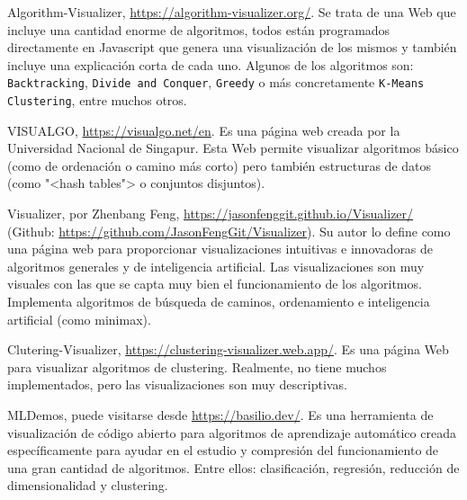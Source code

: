 Algorithm-Visualizer, \url{https://algorithm-visualizer.org/}. Se trata de una
Web que incluye una cantidad enorme de algoritmos, todos están programados
directamente en Javascript que genera una visualización de los mismos y también
incluye una explicación corta de cada uno. Algunos de los algoritmos son:
\texttt{Backtracking}, \texttt{Divide and Conquer}, \texttt{Greedy} o más
concretamente \texttt{K-Means Clustering}, entre muchos otros.

VISUALGO, \url{https://visualgo.net/en}. Es una página web creada por la
Universidad Nacional de Singapur. Esta Web permite visualizar algoritmos básico
(como de ordenación o camino más corto) pero también estructuras de datos (como
"<hash tables"> o conjuntos disjuntos).

Visualizer, por Zhenbang Feng, \url{https://jasonfenggit.github.io/Visualizer/}
(Github: \url{https://github.com/JasonFengGit/Visualizer}). Su autor lo define
como una página web para proporcionar visualizaciones intuitivas e innovadoras
de algoritmos generales y de inteligencia artificial. Las visualizaciones son
muy visuales con las que se capta muy bien el funcionamiento de los algoritmos.
Implementa algoritmos de búsqueda de caminos, ordenamiento e inteligencia
artificial (como minimax).

Clutering-Visualizer, \url{https://clustering-visualizer.web.app/}. Es una
página Web para visualizar algoritmos de clustering. Realmente, no tiene muchos
implementados, pero las visualizaciones son muy descriptivas.

MLDemos, puede visitarse desde \url{https://basilio.dev/}. Es una herramienta de
visualización de código abierto para algoritmos de aprendizaje automático creada
específicamente para ayudar en el estudio y compresión del funcionamiento de una
gran cantidad de algoritmos. Entre ellos: clasificación, regresión, reducción de
dimensionalidad y clustering.
